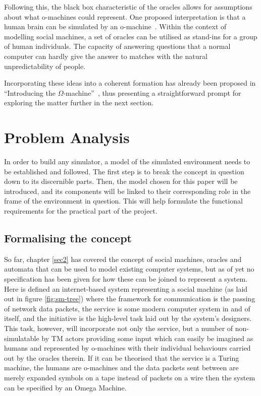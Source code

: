 \documentclass[12pt]{article}
\begin{document}
				Following this, the black box characteristic of the oracles allows for assumptions about what o-machines could represent. One proposed interpretation is that a human brain can be simulated by an o-machine~\cite{Copeland1998}. Within the context of modelling social machines, a set of oracles can be utilised as stand-ins for a group of human individuals. The capacity of answering questions that a normal computer can hardly give the answer to matches with the natural unpredictability of people.
				
				Incorporating these ideas into a coherent formation has already been proposed in ``Introducing the $ \Omega $-machine''~\cite{Zhang2014}, thus presenting a straightforward prompt for exploring the matter further in the next section. 

	\clearpage\section{Problem Analysis}\label{sec3}
		In order to build any simulator, a model of the simulated environment needs to be established and followed. The first step is to break the concept in question down to its discernible parts. Then, the model chosen for this paper will be introduced, and its components will be linked to their corresponding role in the frame of the environment in question. This will help formulate the functional requirements for the practical part of the project.

	\subsection{Formalising the concept}
		So far, chapter \ref{sec2} has covered the concept of social machines, oracles and automata that can be used to model existing computer systems, but as of yet no specification has been given for how these can be joined to represent a system. Here is defined an internet-based system representing a social machine (as laid out in figure \ref{fig:sm-tree}) where the framework for communication is the passing of network data packets, the service is some modern computer system in and of itself, and the initiative is the high-level task laid out by the system's designers. This task, however, will incorporate not only the service, but a number of non-simulatable by TM actors providing some input which can easily be imagined as humans and represented by o-machines with their individual behaviours carried out by the oracles therein. If it can be theorised that the service is a Turing machine, the humans are o-machines and the data packets sent between are merely expanded symbols on a tape instead of packets on a wire then the system can be specified by an Omega Machine.
	
\end{document}
